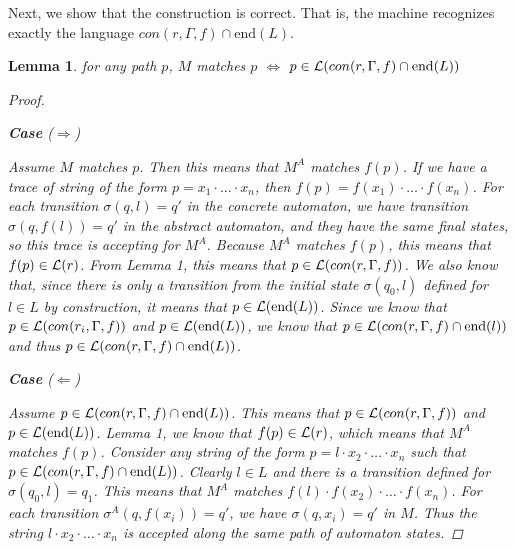 \documentclass[twocolumn, openany]{sig-alternate-10pt}
\newcommand{\EndR}{\ensuremath{\mathrm{end}}}
\newtheorem{lem}[thm]{Lemma}
\begin{document}
Next, we show that the construction is correct. That is, the machine recognizes exactly the language $con(r,\Gamma, f) \cap \EndR(L)$.

\begin{lem}
  for any path $p$, $M$ matches $p$ $\iff$ $p \in \Lang(con(r,\Gamma, f) \cap \EndR(L))$
  \begin{proof} 
    $ $
    \vspace{1em}

    \textbf{Case} ($\Rightarrow$)

    Assume $M$ matches $p$. Then this means that $M^A$ matches $f(p)$. If we have a trace of string of the form $ p = x_1 \cdot \dots \cdot x_n$, then $f(p) = f(x_1) \cdot \dots \cdot f(x_n)$. For each transition $\sigma(q,l) = q'$ in the concrete automaton, we have transition $\sigma(q,f(l)) = q'$ in the abstract automaton, and they have the same final states, so this trace is accepting for $M^A$. Because $M^A$ matches $f(p)$, this means that $f(p) \in \mathcal{L}(r)$. From Lemma 1, this means that $p \in \mathcal{L}(con(r,\Gamma,f))$. We also know that, since there is only a transition from the initial state $\sigma(q_0,l)$ defined for $l \in L$ by construction, it means that $p \in \mathcal{L}(\text{end}(L))$. Since we know that $p \in \mathcal{L}(con(r_i,\Gamma,f))$ and $p \in \mathcal{L}(\text{end}(L))$, we know that $p \in \mathcal{L}(con(r,\Gamma,f) \cap \text{end}(l))$ and thus $p \in \Lang(con(r,\Gamma, f) \cap \EndR(L))$.

    \vspace{1em}
    \textbf{Case} ($\Leftarrow$)

    Assume $p \in \Lang(con(r,\Gamma, f) \cap \EndR(L))$. This means that $p \in \mathcal{L}(con(r,\Gamma,f))$ and $p \in \mathcal{L}(\text{end}(L))$. Lemma 1, we know that $f(p) \in \mathcal{L}(r)$, which means that $M^A$ matches $f(p)$. 
    Consider any string of the form $p = l \cdot x_2 \cdot \dots \cdot x_n$ such that $p \in \mathcal{L}(con(r,\Gamma,f) \cap \text{end}(L))$. Clearly $l \in L$ and there is a transition defined for $\sigma(q_0,l) = q_1$.
    This means that $M^A$ matches $f(l) \cdot f(x_2) \cdot \dots \cdot f(x_n)$.
    For each transition $\sigma^A(q,f(x_i)) = q'$, we have $\sigma(q,x_i) = q'$ in $M$.
    Thus the string $l \cdot x_2 \cdot \dots \cdot x_n$ is accepted along the same path of automaton states.
  \end{proof}

\end{lem}
\end{document}
